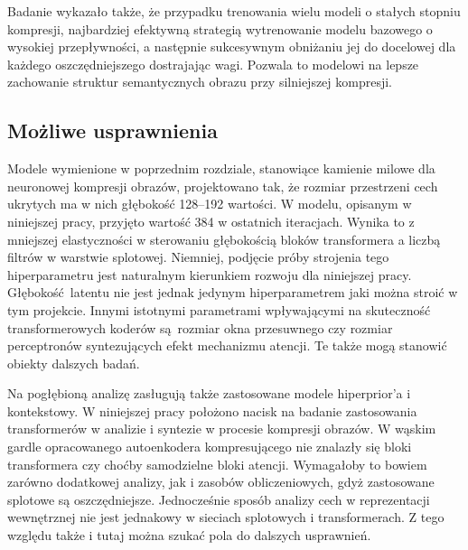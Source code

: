 Badanie wykazało także, że przypadku trenowania wielu modeli o stałych stopniu kompresji, najbardziej efektywną strategią wytrenowanie modelu bazowego o wysokiej przepływności, a następnie sukcesywnym obniżaniu jej do docelowej dla każdego oszczędniejszego dostrajając wagi. Pozwala to modelowi na lepsze zachowanie struktur semantycznych obrazu przy silniejszej kompresji.
\subsection{Możliwe usprawnienia}
Modele wymienione w poprzednim rozdziale, stanowiące kamienie milowe dla neuronowej kompresji obrazów, projektowano tak, że rozmiar przestrzeni cech ukrytych ma w nich głębokość 128--192 wartości. W modelu, opisanym w niniejszej pracy, przyjęto wartość 384 w ostatnich iteracjach. Wynika to z mniejszej elastyczności w sterowaniu głębokością bloków transformera a liczbą filtrów w warstwie splotowej. Niemniej, podjęcie próby strojenia tego hiperparametru jest naturalnym kierunkiem rozwoju dla niniejszej pracy. Głębokość latentu nie jest jednak jedynym hiperparametrem jaki można stroić w tym projekcie. Innymi istotnymi parametrami wpływającymi na skuteczność transformerowych koderów są rozmiar okna przesuwnego czy rozmiar perceptronów syntezujących efekt mechanizmu atencji. Te także mogą stanowić obiekty dalszych badań.

Na pogłębioną analizę zasługują także zastosowane modele hiperprior'a i kontekstowy. W niniejszej pracy położono nacisk na badanie zastosowania transformerów w analizie i syntezie w procesie kompresji obrazów. W wąskim gardle opracowanego autoenkodera kompresującego nie znalazły się bloki transformera czy choćby samodzielne bloki atencji. Wymagałoby to bowiem zarówno dodatkowej analizy, jak i zasobów obliczeniowych, gdyż zastosowane  splotowe są oszczędniejsze. Jednocześnie sposób analizy cech w reprezentacji wewnętrznej nie jest jednakowy w sieciach splotowych i transformerach. Z tego względu także i tutaj można szukać pola do dalszych usprawnień.